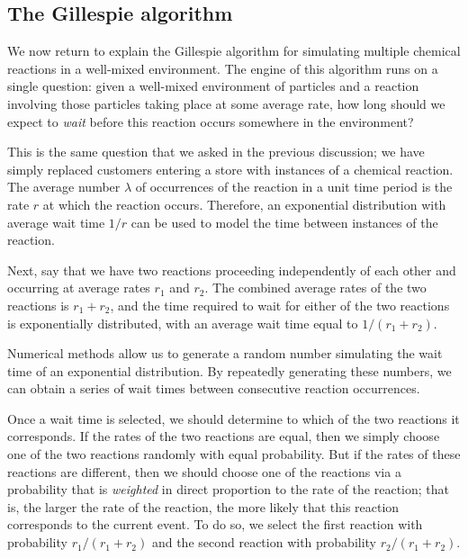 \begin{qbox}\end{qbox}

\FloatBarrier
{}
\subsection{The Gillespie algorithm}

We now return to explain the Gillespie algorithm for simulating multiple chemical reactions in a well-mixed environment. The engine of this algorithm runs on a single question: given a well-mixed environment of particles and a reaction involving those particles taking place at some average rate, how long should we expect to \textit{wait} before this reaction occurs somewhere in the environment?

This is the same question that we asked in the previous discussion; we have simply replaced customers entering a store with instances of a chemical reaction. The average number $\lambda$ of occurrences of the reaction in a unit time period is the rate $r$ at which the reaction occurs. Therefore, an exponential distribution with average wait time $1/r$ can be used to model the time between instances of the reaction.

Next, say that we have two reactions proceeding independently of each other and occurring at average rates $r_1$ and $r_2$. The combined average rates of the two reactions is $r_1 + r_2$, and the time required to wait for either of the two reactions is exponentially distributed, with an average wait time equal to $1/(r_1 + r_2)$.

Numerical methods allow us to generate a random number simulating the wait time of an exponential distribution. By repeatedly generating these numbers, we can obtain a series of wait times between consecutive reaction occurrences.

Once a wait time is selected, we should determine to which of the two reactions it corresponds. If the rates of the two reactions are equal, then we simply choose one of the two reactions randomly with equal probability. But if the rates of these reactions are different, then we should choose one of the reactions via a probability that is \textit{weighted} in direct proportion to the rate of the reaction; that is, the larger the rate of the reaction, the more likely that this reaction corresponds to the current event. To do so, we select the first reaction with probability $r_1/(r_1 + r_2)$ and the second reaction with probability $r_2/(r_1 + r_2)$.\\

